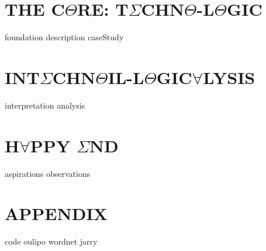 \documentclass[oneside]{thesis}
\begin{document}
\part{\texorpdfstring{THE C$\Theta$RE: T$\Sigma$CHN$\Theta$-L$\Theta$GIC}{THE CORE: TECHNO-LOGIC}}
{foundation}
{description}
{caseStudy}

\part{\texorpdfstring{INT$\Sigma$CHN$\Theta$IL-L$\Theta$GIC$\forall$LYSIS}{INTECHNOIL-LOGICALYSIS}}
{interpretation}
{analysis}

\part{\texorpdfstring{H$\forall$PPY $\Sigma$ND}{HAPPY END}}
{aspirations}
{observations}

\backmatter

\appendix

\part{APPENDIX}
{code}
{oulipo}
{wordnet}
{jarry}
\clearpage

\pagestyle{plain}
{}
\clearpage

{}
\printnoidxglossary
\clearpage
\end{document}
